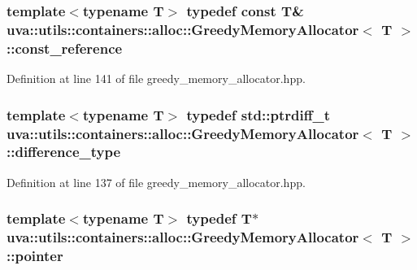 \subsubsection[{const\+\_\+reference}]{\setlength{\rightskip}{0pt plus 5cm}template$<$typename T$>$ typedef const T\& {\bf uva\+::utils\+::containers\+::alloc\+::\+Greedy\+Memory\+Allocator}$<$ T $>$\+::{\bf const\+\_\+reference}}\label{classuva_1_1utils_1_1containers_1_1alloc_1_1_greedy_memory_allocator_a7911b8e1f044aab418c3b46d6df2f92a}


Definition at line 141 of file greedy\+\_\+memory\+\_\+allocator.\+hpp.

\hypertarget{classuva_1_1utils_1_1containers_1_1alloc_1_1_greedy_memory_allocator_a98bc6b16e7d75b7a2e13ddfba36c846d}{}
\subsubsection[{difference\+\_\+type}]{\setlength{\rightskip}{0pt plus 5cm}template$<$typename T$>$ typedef std\+::ptrdiff\+\_\+t {\bf uva\+::utils\+::containers\+::alloc\+::\+Greedy\+Memory\+Allocator}$<$ T $>$\+::{\bf difference\+\_\+type}}\label{classuva_1_1utils_1_1containers_1_1alloc_1_1_greedy_memory_allocator_a98bc6b16e7d75b7a2e13ddfba36c846d}


Definition at line 137 of file greedy\+\_\+memory\+\_\+allocator.\+hpp.

\hypertarget{classuva_1_1utils_1_1containers_1_1alloc_1_1_greedy_memory_allocator_a91591d8ee983d330817127d4acaeea27}{}
\subsubsection[{pointer}]{\setlength{\rightskip}{0pt plus 5cm}template$<$typename T$>$ typedef T$\ast$ {\bf uva\+::utils\+::containers\+::alloc\+::\+Greedy\+Memory\+Allocator}$<$ T $>$\+::{\bf pointer}}\label{classuva_1_1utils_1_1containers_1_1alloc_1_1_greedy_memory_allocator_a91591d8ee983d330817127d4acaeea27}


